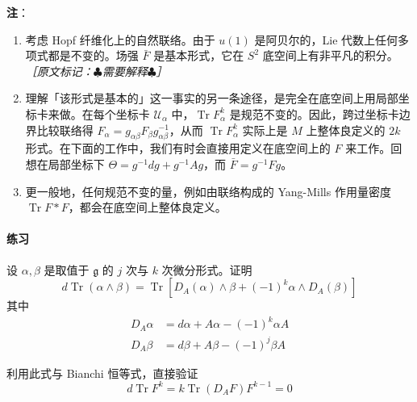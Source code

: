 \textbf{注}：

\begin{enumerate}
  \item 考虑 Hopf 纤维化上的自然联络。由于 $u(1)$ 是阿贝尔的，Lie 代数上任何多项式都是不变的。场强 $\bar F$ 是基本形式，它在 $S^2$ 底空间上有非平凡的积分。{\small\itshape ［原文标记：$\clubsuit$需要解释$\clubsuit$］}
  \item 理解「该形式是基本的」这一事实的另一条途径，是完全在底空间上用局部坐标卡来做。在每个坐标卡 $\mathcal{U}_\alpha$ 中，$\operatorname{Tr}F_\alpha^k$ 是规范不变的。因此，跨过坐标卡边界比较联络得 $F_\alpha=g_{\alpha\beta}F_\beta g_{\alpha\beta}^{-1}$，从而 $\operatorname{Tr}F_\alpha^k$ 实际上是 $M$ 上整体良定义的 $2k$ 形式。在下面的工作中，我们有时会直接用定义在底空间上的 $F$ 来工作。回想在局部坐标下 $\Theta=g^{-1}dg+g^{-1}Ag$，而 $\bar F=g^{-1}Fg$。
  \item 更一般地，任何规范不变的量，例如由联络构成的 Yang-Mills 作用量密度 $\operatorname{Tr}F*F$，都会在底空间上整体良定义。
\end{enumerate}


\paragraph{练习}
设 $\alpha,\beta$ 是取值于 $\mathfrak{g}$ 的 $j$ 次与 $k$ 次微分形式。证明
\begin{equation}
  \boxed{\,d\operatorname{Tr}(\alpha\wedge\beta)
  = \operatorname{Tr}\left[D_A(\alpha)\wedge\beta+(-1)^k\alpha\wedge D_A(\beta)\right]\,}
  \tag{I.15}
  \label{eq:I.15}
\end{equation}
其中
\begin{equation}
\begin{aligned}
  D_A\alpha &= d\alpha+A\alpha-(-1)^k\alpha A\\
  D_A\beta &= d\beta+A\beta-(-1)^j\beta A
\end{aligned}
  \tag{I.16}
  \label{eq:I.16}
\end{equation}

利用此式与 Bianchi 恒等式，直接验证
\begin{equation}
  d\operatorname{Tr}F^k = k\operatorname{Tr}(D_AF)F^{k-1} = 0
  \tag{I.17}
  \label{eq:I.17}
\end{equation}

